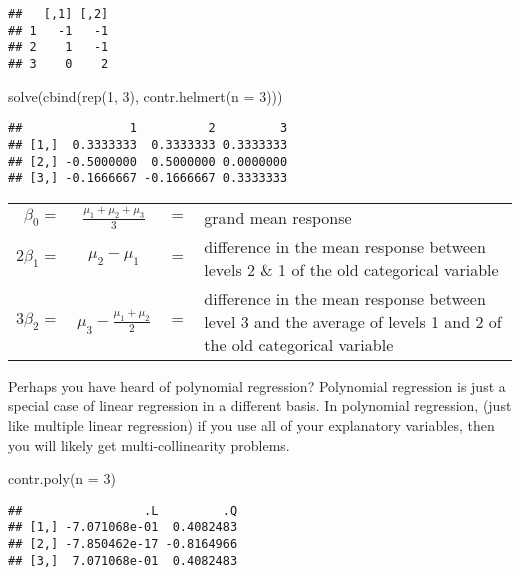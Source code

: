 \documentclass[
]{book}
\newenvironment{Shaded}{\begin{snugshade}}{\end{snugshade}}
\newcommand{\AttributeTok}[1]{\textcolor[rgb]{0.77,0.63,0.00}{#1}}
\newcommand{\DecValTok}[1]{\textcolor[rgb]{0.00,0.00,0.81}{#1}}
\newcommand{\FunctionTok}[1]{\textcolor[rgb]{0.00,0.00,0.00}{#1}}
\newcommand{\NormalTok}[1]{#1}
\begin{document}
\begin{verbatim}
##   [,1] [,2]
## 1   -1   -1
## 2    1   -1
## 3    0    2
\end{verbatim}

\begin{Shaded}
\begin{Highlighting}[]
\FunctionTok{solve}\NormalTok{(}\FunctionTok{cbind}\NormalTok{(}\FunctionTok{rep}\NormalTok{(}\DecValTok{1}\NormalTok{, }\DecValTok{3}\NormalTok{), }\FunctionTok{contr.helmert}\NormalTok{(}\AttributeTok{n =} \DecValTok{3}\NormalTok{)))}
\end{Highlighting}
\end{Shaded}

\begin{verbatim}
##               1          2         3
## [1,]  0.3333333  0.3333333 0.3333333
## [2,] -0.5000000  0.5000000 0.0000000
## [3,] -0.1666667 -0.1666667 0.3333333
\end{verbatim}

\begin{tabularx}{\textwidth}{r c c X}
\(\beta_0 =\) &\(\tfrac{\mu_1+\mu_2+\mu_3}{3}\) &\(=\) &grand mean response \\
\(2\beta_1 =\) &\(\mu_2 - \mu_1\) &\(=\) &difference in the mean response between levels 2 \& 1 of the old categorical variable \\
\(3\beta_2 =\) &\(\mu_3 - \tfrac{\mu_1+\mu_2}{2}\) &\(=\) &difference in the mean response between level 3 and the average of levels 1 and 2 of the old categorical variable
\end{tabularx}

Perhaps you have heard of polynomial regression? Polynomial regression
is just a special case of linear regression in a different basis. In
polynomial regression, (just like multiple linear regression) if you use
all of your explanatory variables, then you will likely get
multi-collinearity problems.

\begin{Shaded}
\begin{Highlighting}[]
\FunctionTok{contr.poly}\NormalTok{(}\AttributeTok{n =} \DecValTok{3}\NormalTok{)}
\end{Highlighting}
\end{Shaded}

\begin{verbatim}
##                 .L         .Q
## [1,] -7.071068e-01  0.4082483
## [2,] -7.850462e-17 -0.8164966
## [3,]  7.071068e-01  0.4082483
\end{verbatim}
\end{document}
